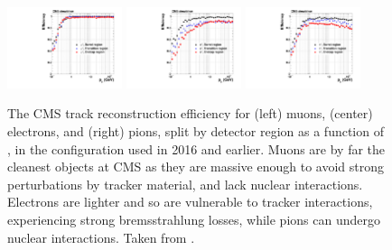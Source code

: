   \begin{figure}[h!]
    \centering
    \includegraphics[width=0.3\textwidth]{figures/mu/efficiencyVsPt.pdf}
    \includegraphics[width=0.3\textwidth]{figures/el/efficiencyVsPt.pdf}
    \includegraphics[width=0.3\textwidth]{figures/pi/efficiencyVsPt.pdf}
    \caption[Track reconstruction efficiency.]{
      The CMS track reconstruction efficiency for (left) muons, (center) electrons, and (right) pions, split by detector region as a function of \pt, in the configuration used in 2016 and earlier. 
      Muons are by far the cleanest objects at CMS as they are massive enough to avoid strong perturbations by tracker material, and lack nuclear interactions.
      Electrons are lighter and so are vulnerable to tracker interactions, experiencing strong bremsstrahlung losses, while pions can undergo nuclear interactions.
      Taken from \cite{cmstracking}.}
    \label{fig:trackefficiency}
  \end{figure}  

